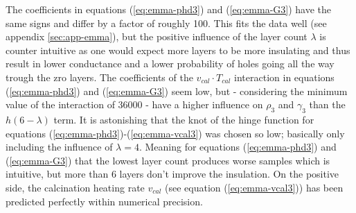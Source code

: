 The coefficients in equations (\ref{eq:emma-phd3}) and (\ref{eq:emma-G3}) have the same signs and differ by a factor of roughly 100.
This fits the data well (see appendix \ref{sec:app-emma}), but the positive influence of the layer count $\lambda$ is counter intuitive 
as one would expect more layers to be more insulating and thus result in lower conductance and a lower probability of holes going all the way trough the \gls{zro} layers. %
The coefficients of the $v_{cal} \cdot T_{cal}$ interaction in equations (\ref{eq:emma-phd3}) and (\ref{eq:emma-G3}) 
seem low, but - considering the minimum value of the interaction of \num{36000} - have a higher influence on $\rho_3$ and $\gamma_3$ than the $h(6-\lambda)$ term. 
It is astonishing that the knot of the hinge function for equations (\ref{eq:emma-phd3})-(\ref{eq:emma-vcal3}) was chosen so low; 
basically only including the influence of $\lambda=4$.
Meaning for equations (\ref{eq:emma-phd3}) and (\ref{eq:emma-G3}) that the lowest layer count produces worse samples which is intuitive, but more than 6 layers don't improve the insulation. 
On the positive side, the calcination heating rate $v_{cal}$ (see equation (\ref{eq:emma-vcal3})) has been predicted perfectly within numerical precision. 


